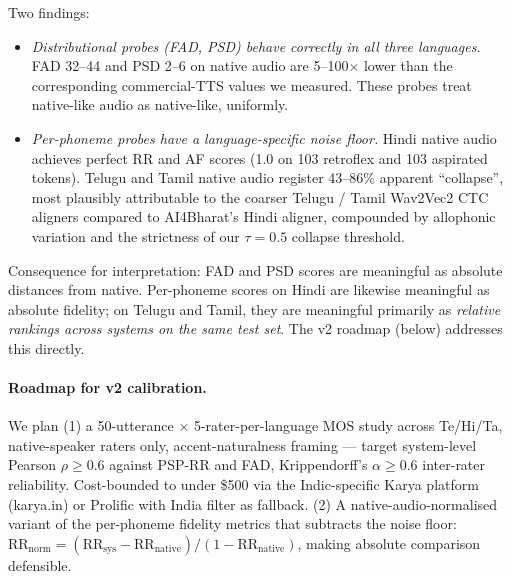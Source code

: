\documentclass[conference,a4paper]{IEEEtran}
\newcommand{\psp}{\textsc{PSP}}
\begin{document}
\begin{table}[t]
\centering
\caption{Native-audio sanity check: scores each PSP dimension produces on native (held-out) audio. Ideal: per-phoneme $\to$ 1.0, corpus-level $\to$ 0.}
\label{tab:sanity}
\small
{}
\end{table}

Two findings:
\begin{itemize}
  \item \emph{Distributional probes (FAD, PSD) behave correctly in all three languages.} FAD 32--44 and PSD 2--6 on native audio are 5--100$\times$ lower than the corresponding commercial-TTS values we measured. These probes treat native-like audio as native-like, uniformly.
  \item \emph{Per-phoneme probes have a language-specific noise floor.} Hindi native audio achieves perfect RR and AF scores (1.0 on 103 retroflex and 103 aspirated tokens). Telugu and Tamil native audio register 43--86\% apparent ``collapse'', most plausibly attributable to the coarser Telugu / Tamil Wav2Vec2 CTC aligners compared to AI4Bharat's Hindi aligner, compounded by allophonic variation and the strictness of our $\tau = 0.5$ collapse threshold.
\end{itemize}
Consequence for interpretation: FAD and PSD scores are meaningful as absolute distances from native. Per-phoneme scores on Hindi are likewise meaningful as absolute fidelity; on Telugu and Tamil, they are meaningful primarily as \emph{relative rankings across systems on the same test set}. The v2 roadmap (below) addresses this directly.

\paragraph{Roadmap for v2 calibration.} We plan (1) a 50-utterance $\times$ 5-rater-per-language MOS study across Te/Hi/Ta, native-speaker raters only, accent-naturalness framing --- target system-level Pearson $\rho \geq 0.6$ against \psp-RR and FAD, Krippendorff's $\alpha \geq 0.6$ inter-rater reliability. Cost-bounded to under \$500 via the Indic-specific Karya platform (karya.in) or Prolific with India filter as fallback. (2) A native-audio-normalised variant of the per-phoneme fidelity metrics that subtracts the noise floor: $\text{RR}_{\text{norm}} = (\text{RR}_{\text{sys}} - \text{RR}_{\text{native}}) / (1 - \text{RR}_{\text{native}})$, making absolute comparison defensible.
\end{document}
